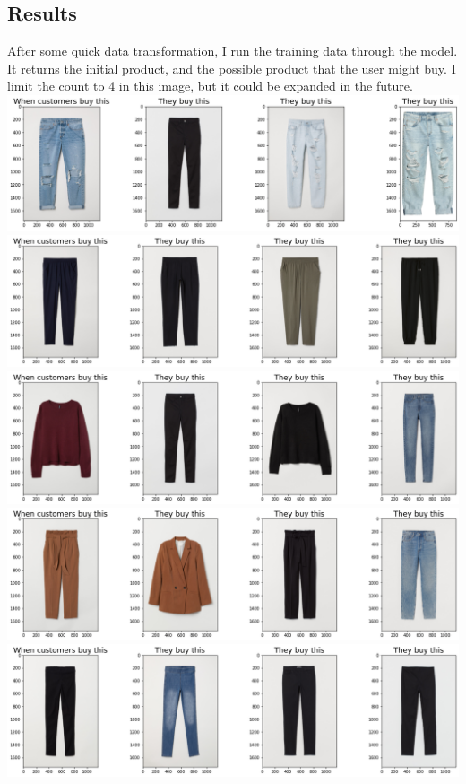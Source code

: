 \documentclass{article}
\begin{document}
\subsection{Results}
After some quick data transformation, I run the training data through the model. It returns the initial product, and the possible product that the user might buy. I limit the count to 4 in this image, but it could be expanded in the future.\\
\includegraphics[width=\textwidth]{images/finalprg.png}
\includegraphics[width=\textwidth]{images/finalprg1.png}
\includegraphics[width=\textwidth]{images/finalprg2.png}
\includegraphics[width=\textwidth]{images/finalprg3.png}
\includegraphics[width=\textwidth]{images/finalprg4.png}
\end{document}
